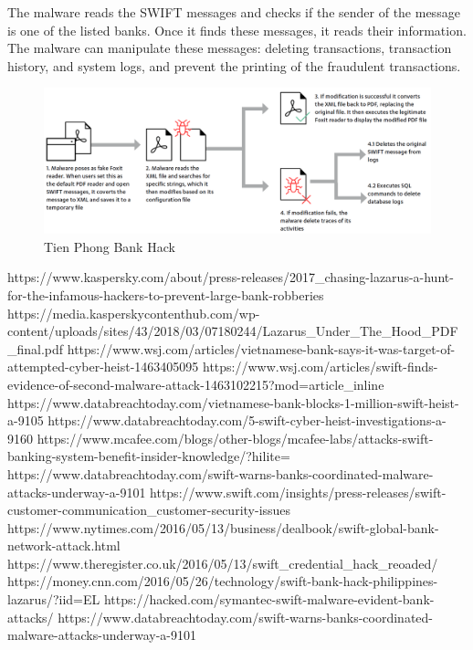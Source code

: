 \documentclass[12pt]{article}
\begin{document}
        The malware reads the SWIFT messages and checks if the sender of the message is one of the listed banks. Once it finds these messages, it reads their information. The malware can manipulate these messages: deleting transactions, transaction history, and system logs, and prevent the printing of the fraudulent transactions.
        
        \begin{figure}[H]
        \centering
        \includegraphics[width=\textwidth]{figures/vietnam.png}
        \caption{Tien Phong Bank Hack}
        \label{fig:VietnamHacks}
        \end{figure}
        
        https://www.kaspersky.com/about/press-releases/2017_chasing-lazarus-a-hunt-for-the-infamous-hackers-to-prevent-large-bank-robberies
        https://media.kasperskycontenthub.com/wp-content/uploads/sites/43/2018/03/07180244/Lazarus_Under_The_Hood_PDF_final.pdf
        https://www.wsj.com/articles/vietnamese-bank-says-it-was-target-of-attempted-cyber-heist-1463405095
        https://www.wsj.com/articles/swift-finds-evidence-of-second-malware-attack-1463102215?mod=article_inline
        https://www.databreachtoday.com/vietnamese-bank-blocks-1-million-swift-heist-a-9105
        https://www.databreachtoday.com/5-swift-cyber-heist-investigations-a-9160
        https://www.mcafee.com/blogs/other-blogs/mcafee-labs/attacks-swift-banking-system-benefit-insider-knowledge/?hilite=%
        https://www.databreachtoday.com/swift-warns-banks-coordinated-malware-attacks-underway-a-9101
        https://www.swift.com/insights/press-releases/swift-customer-communication_customer-security-issues
        https://www.nytimes.com/2016/05/13/business/dealbook/swift-global-bank-network-attack.html
        https://www.theregister.co.uk/2016/05/13/swift_credential_hack_reoaded/
        https://money.cnn.com/2016/05/26/technology/swift-bank-hack-philippines-lazarus/?iid=EL
        https://hacked.com/symantec-swift-malware-evident-bank-attacks/
        https://www.databreachtoday.com/swift-warns-banks-coordinated-malware-attacks-underway-a-9101
        
\end{document}
